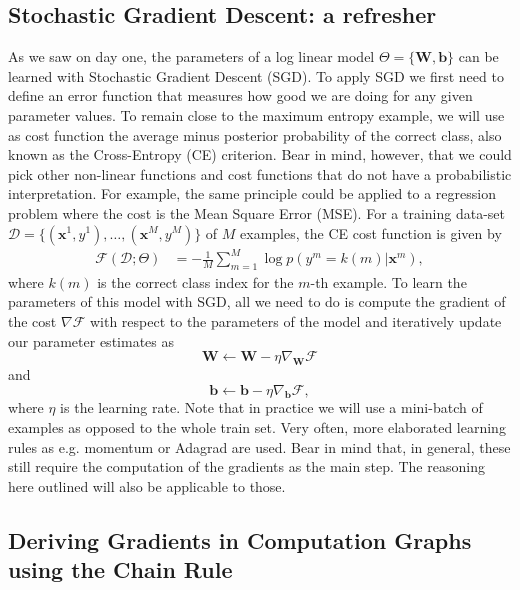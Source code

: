\subsection{Stochastic Gradient Descent: a refresher}

As we saw on day one, the parameters of a log linear model
$\Theta=\{\mathbf{W}, \mathbf{b}\}$ can be learned with Stochastic Gradient
Descent (SGD). To apply SGD we first need to define an error function that
measures how good we are doing for any given parameter values. To remain close
to the maximum entropy example, we will use as cost function the average minus
posterior probability of the correct class, also known as the Cross-Entropy
(CE) criterion. Bear in mind, however, that we could pick other non-linear
functions and cost functions that do not have a probabilistic interpretation.
For example, the same principle could be applied to a regression problem where
the cost is the Mean Square Error (MSE).  For a training data-set $\mathcal{D}
= \{(\mathbf{x}^1,y^1), \ldots, (\mathbf{x}^M,y^M)\}$ of $M$ examples, the CE
cost function is given by
%
\begin{align}
\mathcal{F}(\mathcal{D};\Theta)
& = -\frac{1}{M}\sum_{m=1}^{M} \log p(y^m=k(m) | \mathbf{x}^m),
\label{eq:CostLogPos}
\end{align}
%
where $k(m)$ is the correct class index for the $m$-th example.
To learn the parameters of this model with SGD, all we need to do is compute the gradient
of the cost $\nabla\mathcal{F}$ with respect to the parameters of the model and
iteratively update our  parameter estimates as
%
\begin{equation}
\mathbf{W} \leftarrow \mathbf{W} - \eta \nabla_\mathbf{W}\mathcal{F}
\end{equation}
and
\begin{equation}
\mathbf{b} \leftarrow \mathbf{b} - \eta \nabla_\mathbf{b}\mathcal{F},
\end{equation}
%
\noindent where $\eta$ is the learning rate. Note that in practice we will use
a mini-batch of examples as opposed to the whole train set. Very often, more
elaborated learning rules as e.g. momentum or Adagrad are used. Bear in mind
that, in general, these still require the computation of the gradients as the
main step. The reasoning here outlined will also be applicable to those.

\subsection{Deriving Gradients in Computation Graphs using the Chain Rule}


